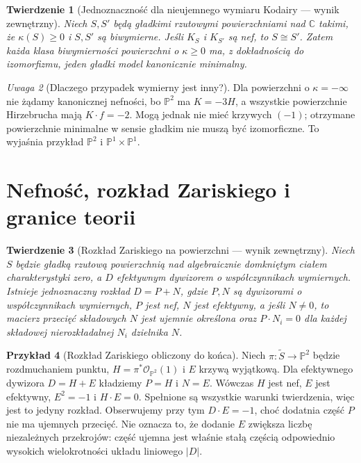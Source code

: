 \documentclass[11pt,a4paper,openany]{report}
\numberwithin{equation}{section}
\theoremstyle{plain}
\newtheorem{twierdzenie}{Twierdzenie}[section]
\theoremstyle{definition}
\newtheorem{przyklad}[twierdzenie]{Przykład}
\theoremstyle{remark}
\newtheorem{uwaga}[twierdzenie]{Uwaga}
\newcommand{\C}{\mathbb C}
\newcommand{\PP}{\mathbb P}
\begin{document}
\begin{twierdzenie}[Jednoznaczność dla nieujemnego wymiaru Kodairy — wynik zewnętrzny]
\label{tw:ga8-minimal-unique}
Niech $S,S'$ będą gładkimi rzutowymi powierzchniami
nad $\C$ takimi, że $\kappa(S)\ge0$ i $S,S'$
są biwymierne. Jeśli $K_S$ i $K_{S'}$ są nef,
to $S\cong S'$. Zatem każda klasa biwymierności
powierzchni o $\kappa\ge0$ ma, z dokładnością do
izomorfizmu, jeden gładki model kanonicznie minimalny.
\end{twierdzenie}
\begin{uwaga}[Dlaczego przypadek wymierny jest inny?]
Dla powierzchni o $\kappa=-\infty$ nie żądamy
kanonicznej nefności, bo $\PP^2$ ma $K=-3H$,
a wszystkie powierzchnie Hirzebrucha mają
$K\cdot f=-2$. Mogą jednak nie mieć krzywych
$(-1)$; otrzymane powierzchnie minimalne w sensie gładkim
nie muszą być izomorficzne. To wyjaśnia przykład
$\PP^2$ i $\PP^1\times\PP^1$.
\end{uwaga}

\section{Nefność, rozkład Zariskiego i granice teorii}
\label{sec:ga8-zariski-decomposition}

\begin{twierdzenie}[Rozkład Zariskiego na powierzchni — wynik zewnętrzny]
\label{tw:ga8-zariski-decomposition}
Niech $S$ będzie gładką rzutową powierzchnią nad
algebraicznie domkniętym ciałem charakterystyki zero,
a $D$ efektywnym dywizorem o współczynnikach wymiernych.
Istnieje jednoznaczny rozkład $D=P+N$, gdzie
$P,N$ są dywizorami o współczynnikach wymiernych,
$P$ jest nef, $N$ jest efektywny, a jeśli $N\ne0$,
to macierz przecięć składowych $N$ jest ujemnie
określona oraz $P\cdot N_i=0$ dla każdej składowej
nierozkładalnej $N_i$ dzielnika $N$.
\end{twierdzenie}

\begin{przyklad}[Rozkład Zariskiego obliczony do końca]
Niech $\pi:\widetilde S\to\PP^2$ będzie rozdmuchaniem
punktu, $H=\pi^*\mathcal O_{\PP^2}(1)$ i $E$
krzywą wyjątkową. Dla efektywnego dywizora
$D=H+E$ kładziemy $P=H$ i $N=E$.
Wówczas $H$ jest nef, $E$ jest efektywny,
$E^2=-1$ i $H\cdot E=0$. Spełnione są wszystkie
warunki twierdzenia, więc jest to jedyny rozkład.
Obserwujemy przy tym $D\cdot E=-1$,
choć dodatnia część $P$ nie ma ujemnych przecięć.
Nie oznacza to, że dodanie $E$ zwiększa liczbę
niezależnych przekrojów: część ujemna jest
właśnie stałą częścią odpowiednio wysokich
wielokrotności układu liniowego $|D|$.
\end{przyklad}
\end{document}
